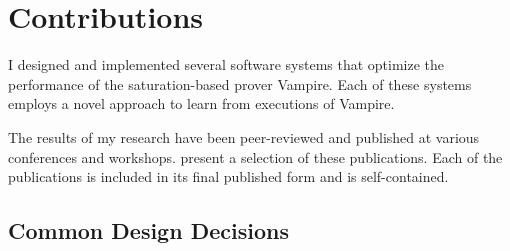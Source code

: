 %
%


\newpage

\section{Contributions}
\label{sec:contributions}



I designed and implemented several software systems that optimize the performance of the saturation-based prover Vampire.
Each of these systems employs a novel approach to learn from executions of Vampire.

The results of my research have been peer-reviewed and published at various conferences and workshops.
present a selection of these publications.
Each of the publications is included in its final published form and is self-contained.

\subsection{Common Design Decisions}

